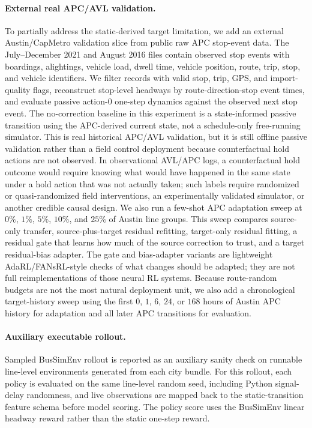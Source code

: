 \paragraph{External real APC/AVL validation.}
To partially address the static-derived target limitation, we add an external Austin/CapMetro validation slice from public raw APC stop-event data.
The July--December 2021 and August 2016 files contain observed stop events with boardings, alightings, vehicle load, dwell time, vehicle position, route, trip, stop, and vehicle identifiers.
We filter records with valid stop, trip, GPS, and import-quality flags, reconstruct stop-level headways by route-direction-stop event times, and evaluate passive action-$0$ one-step dynamics against the observed next stop event.
The no-correction baseline in this experiment is a state-informed passive transition using the APC-derived current state, not a schedule-only free-running simulator.
This is real historical APC/AVL validation, but it is still offline passive validation rather than a field control deployment because counterfactual hold actions are not observed.
In observational AVL/APC logs, a counterfactual hold outcome would require knowing what would have happened in the same state under a hold action that was not actually taken; such labels require randomized or quasi-randomized field interventions, an experimentally validated simulator, or another credible causal design.
We also run a few-shot APC adaptation sweep at $0\%$, $1\%$, $5\%$, $10\%$, and $25\%$ of Austin line groups.
This sweep compares source-only transfer, source-plus-target residual refitting, target-only residual fitting, a residual gate that learns how much of the source correction to trust, and a target residual-bias adapter.
The gate and bias-adapter variants are lightweight AdaRL/FANsRL-style checks of what changes should be adapted; they are not full reimplementations of those neural RL systems.
Because route-random budgets are not the most natural deployment unit, we also add a chronological target-history sweep using the first $0$, $1$, $6$, $24$, or $168$ hours of Austin APC history for adaptation and all later APC transitions for evaluation.

\paragraph{Auxiliary executable rollout.}
Sampled BusSimEnv rollout is reported as an auxiliary sanity check on runnable line-level environments generated from each city bundle.
For this rollout, each policy is evaluated on the same line-level random seed, including Python signal-delay randomness, and live observations are mapped back to the static-transition feature schema before model scoring.
The policy score uses the BusSimEnv linear headway reward rather than the static one-step reward.

